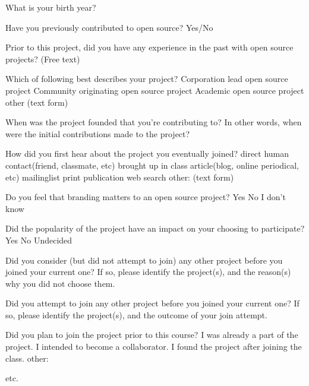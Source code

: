 \begin{table}
What is your birth year?

Have you previously contributed to open source? Yes/No

Prior to this project, did you have any experience in the past with open source projects? (Free text)

Which of following best describes your project?
  Corporation lead open source project
  Community originating open source project
  Academic open source project
  other (text form)

When was the project founded that you're contributing to? In other words, when were the initial contributions made to the project?

How did you first hear about the project you eventually joined?
 direct human contact(friend, classmate, etc)
 brought up in class
 article(blog, online periodical, etc)
 mailinglist
 print publication
 web search
 other: (text form)

 Do you feel that branding matters to an open source project?
  Yes
 No
 I don't know

 Did the popularity of the project have an impact on your choosing to participate?
  Yes
 No
 Undecided

 Did you consider (but did not attempt to join) any other project before you joined your current one? If so, please identify the project(s), and the reason(s) why you did not choose them.

 Did you attempt to join any other project before you joined your current one? If so, please identify the project(s), and the outcome of your join attempt.

 Did you plan to join the project prior to this course?
  I was already a part of the project.
 I intended to become a collaborator.
 I found the project after joining the class.
 other: 

etc.
\caption{Questions used in our survey}
\label{tab:survey_question}
\end{table}